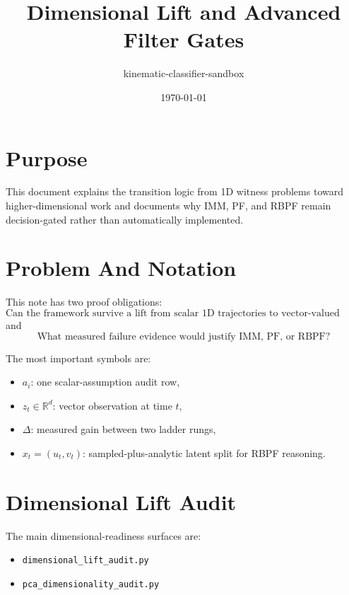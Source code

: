 \documentclass[11pt]{article}
\title{Dimensional Lift and Advanced Filter Gates}
\author{kinematic-classifier-sandbox}
\date{\today}
\begin{document}
\maketitle

\section{Purpose}

This document explains the transition logic from 1D witness problems toward
higher-dimensional work and documents why IMM, PF, and RBPF remain
decision-gated rather than automatically implemented.

\section{Problem And Notation}

This note has two proof obligations:
\begin{equation}
    \text{Can the framework survive a lift from scalar 1D trajectories to vector-valued trajectories?}
\end{equation}
and
\begin{equation}
    \text{What measured failure evidence would justify IMM, PF, or RBPF?}
\end{equation}

The most important symbols are:
\begin{itemize}[leftmargin=1.5em]
    \item \(a_i\): one scalar-assumption audit row,
    \item \(z_t \in \mathbb{R}^d\): vector observation at time \(t\),
    \item \(\Delta\): measured gain between two ladder rungs,
    \item \(x_t = (u_t, v_t)\): sampled-plus-analytic latent split for RBPF reasoning.
\end{itemize}

\section{Dimensional Lift Audit}

The main dimensional-readiness surfaces are:
\begin{itemize}[leftmargin=1.5em]
    \item \texttt{dimensional\_lift\_audit.py}
    \item \texttt{pca\_dimensionality\_audit.py}
\end{itemize}
\end{document}
